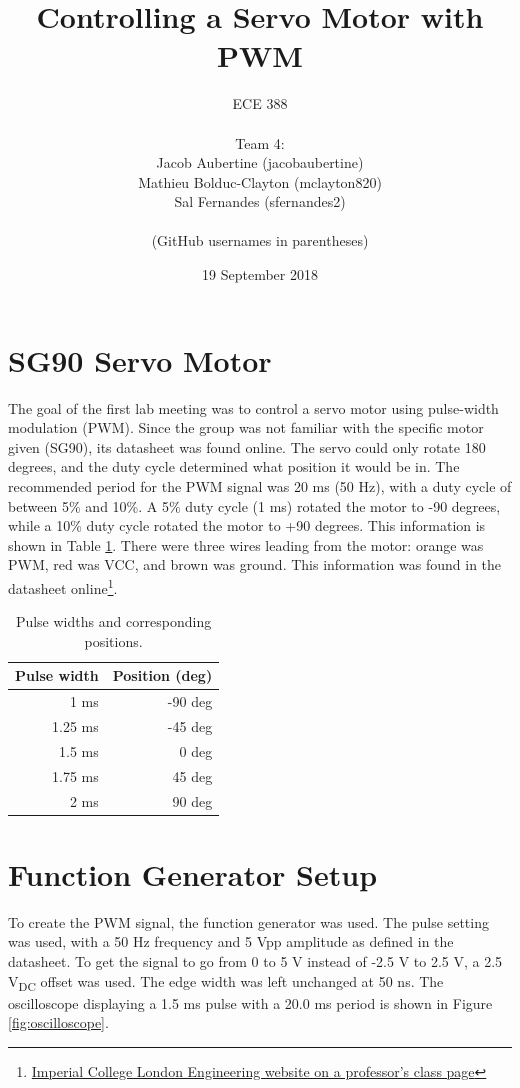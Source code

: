 \documentclass{article}
\title{Controlling a Servo Motor with PWM}
\date{19 September 2018}
\author{
	ECE 388
	\\
	\\
	Team 4:
	\\
	Jacob Aubertine (jacobaubertine)
	\\
	Mathieu Bolduc-Clayton (mclayton820)
	\\
	Sal Fernandes (sfernandes2)
	\\
	\\
	(GitHub usernames in parentheses)
}
\begin{document}
	\maketitle
	\newpage

	\section{SG90 Servo Motor}
	The goal of the first lab meeting was to control a servo motor using pulse-width modulation (PWM). Since the group was not familiar with the specific motor given (SG90), its datasheet was found online. The servo could only rotate 180 degrees, and the duty cycle determined what position it would be in. The recommended period for the PWM signal was 20 ms (50 Hz), with a duty cycle of between 5\% and 10\%. A 5\% duty cycle (1 ms) rotated the motor to -90 degrees, while a 10\% duty cycle rotated the motor to +90 degrees. This information is shown in Table \ref{tab:table1}. There were three wires leading from the motor: orange was PWM, red was VCC, and brown was ground. This information was found in the datasheet online\footnote{\href{http://www.ee.ic.ac.uk/pcheung/teaching/DE1_EE/stores/sg90_datasheet.pdf}{Imperial College London Engineering website on a professor's class page}}.

	\begin{table}[h!]
  		\begin{center}
    			\caption{Pulse widths and corresponding positions.}
    			\label{tab:table1}
    			\begin{tabular}{r|r}
      				\textbf{Pulse width} & \textbf{Position (deg)} \\
				\hline
      				1 ms& -90 deg\\
      				1.25 ms & -45 deg\\
      				1.5 ms & 0 deg\\
      				1.75 ms & 45 deg\\
				2 ms& 90 deg\\
   			 \end{tabular}
  		\end{center}
	\end{table}

	\section{Function Generator Setup}
	To create the PWM signal, the function generator was used. The pulse setting was used, with a 50 Hz frequency and 5 Vpp amplitude as defined in the datasheet. To get the signal to go from 0 to 5 V instead of -2.5 V to 2.5 V, a 2.5 V\textsubscript{DC} offset was used. The edge width was left unchanged at 50 ns. The oscilloscope displaying a 1.5 ms pulse with a 20.0 ms period is shown in Figure \ref{fig:oscilloscope}.
\end{document}
